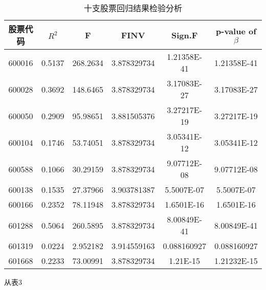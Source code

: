 \begin{table}[ht]
\centering
\caption{十支股票回归结果检验分析}\label{inv9_tab3}
\begin{tabular}{|c|c|c|c|c|c|}
\hline
股票代码 & $R^{2}$ & F & FINV& Sign.F & p-value of $\beta$\\
\hline
600016 & 0.5137 & 268.2634 & 3.878329734& 1.21358E-41 & 1.21358E-41\\
\hline
600028 & 0.3692 & 148.6465 & 3.878329734 & 3.17083E-27 & 3.17083E-27\\
\hline
600050 & 0.2909 & 95.98651 &3.881505376& 3.27217E-19 & 3.27217E-19\\
\hline
600104 & 0.1746 & 53.74051 &3.878329734& 3.05341E-12 & 3.05341E-12\\
\hline
600588 & 0.1066 & 30.29159 &3.878329734& 9.07712E-08 & 9.07712E-08\\
\hline
600138 & 0.1535 & 27.37966 &3.903781387& 5.5007E-07 & 5.5007E-07\\
\hline
600166 & 0.2352 & 78.11948 &3.878329734& 1.6501E-16 & 1.6501E-16\\
\hline
601288 & 0.5064 & 260.5895 & 3.878329734&8.00849E-41 & 8.00849E-41\\
\hline
601319 & 0.0224 & 2.952182 &3.914559163& 0.088160927 & 0.088160927\\
\hline
601668 & 0.2233 & 73.00991 &3.878329734 & 1.21E-15 & 1.21232E-15\\
\hline
\end{tabular}
\end{table}

从表3










